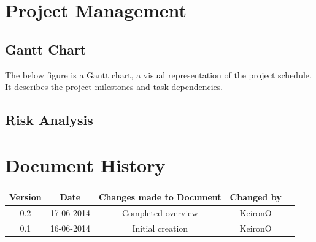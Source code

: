 \documentclass[11pt,a4paper]{article}
\begin{document}
\clearpage
\section{Project Management}

\subsection{Gantt Chart}

The below figure is a Gantt chart, a visual representation of the project schedule. It describes the project milestones and task dependencies.

\subsection{Risk Analysis}

\clearpage

\section*{Document History}

\begin{center}
\begin{tabular}{|c | c | c | c | c |}
\hline
\textbf{Version} \cellcolor{gray!25} & \textbf{Date} \cellcolor{gray!25}& \cellcolor{gray!25}\textbf{Changes made to Document} &\textbf{ Changed by} \cellcolor{gray!25}\\
\hline
0.2 & 17-06-2014 & Completed overview & KeironO \\
\hline
0.1 & 16-06-2014 & Initial creation & KeironO \\
\hline

\hline
\end{tabular}
\end{center}
\clearpage
\end{document}
